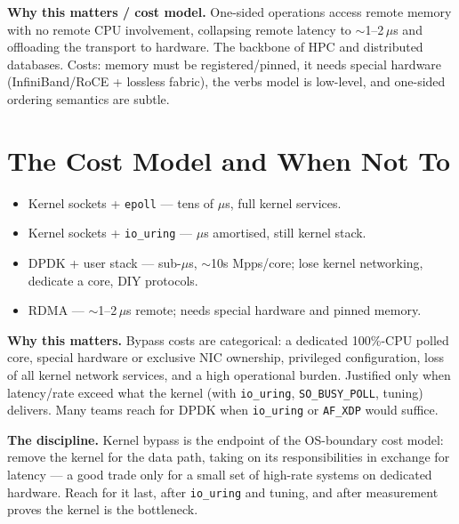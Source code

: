 \textbf{Why this matters / cost model.} One-sided operations access remote memory with no remote CPU involvement, collapsing remote latency to $\sim$1--2\,$\mu$s and offloading the transport to hardware. The backbone of HPC and distributed databases. Costs: memory must be registered/pinned, it needs special hardware (InfiniBand/RoCE + lossless fabric), the verbs model is low-level, and one-sided ordering semantics are subtle.

\section{The Cost Model and When Not To}
\begin{itemize}
\item Kernel sockets + \texttt{epoll} --- tens of $\mu$s, full kernel services.
\item Kernel sockets + \texttt{io\_uring} --- $\mu$s amortised, still kernel stack.
\item DPDK + user stack --- sub-$\mu$s, $\sim$10s Mpps/core; lose kernel networking, dedicate a core, DIY protocols.
\item RDMA --- $\sim$1--2\,$\mu$s remote; needs special hardware and pinned memory.
\end{itemize}

\textbf{Why this matters.} Bypass costs are categorical: a dedicated 100\%-CPU polled core, special hardware or exclusive NIC ownership, privileged configuration, loss of all kernel network services, and a high operational burden. Justified only when latency/rate exceed what the kernel (with \texttt{io\_uring}, \texttt{SO\_BUSY\_POLL}, tuning) delivers. Many teams reach for DPDK when \texttt{io\_uring} or \texttt{AF\_XDP} would suffice.

\textbf{The discipline.} Kernel bypass is the endpoint of the OS-boundary cost model: remove the kernel for the data path, taking on its responsibilities in exchange for latency --- a good trade only for a small set of high-rate systems on dedicated hardware. Reach for it last, after \texttt{io\_uring} and tuning, and after measurement proves the kernel is the bottleneck.
